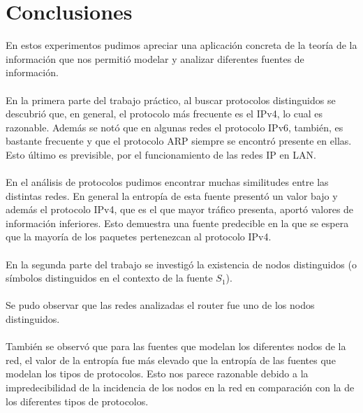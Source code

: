 \section{Conclusiones}
En estos experimentos pudimos apreciar una aplicación concreta de la teoría de la información que nos permitió modelar y analizar diferentes fuentes de información.
\\\\
En la primera parte del trabajo práctico, al buscar protocolos distinguidos se descubrió que, en general, el protocolo más frecuente es el IPv4, lo cual es razonable. Además se notó que en algunas redes el protocolo IPv6, también, es bastante frecuente y que el protocolo ARP siempre se encontró presente en ellas. Esto último es previsible, por el funcionamiento de las redes IP en LAN.
\\\\
En el análisis de protocolos pudimos encontrar muchas similitudes entre las distintas redes. En general la entropía de esta fuente presentó un valor bajo y además el protocolo IPv4, que es el que mayor tráfico presenta, aportó valores de información inferiores. Esto demuestra una fuente predecible en la que se espera que la mayoría de los paquetes pertenezcan al protocolo IPv4.
\\\\
En la segunda parte del trabajo se investigó la existencia de nodos distinguidos (o símbolos distinguidos en el contexto de la fuente $S_1$).
\\\\
Se pudo observar que las redes analizadas el router fue uno de los nodos distinguidos.
\\\\
También se observó que para las fuentes que modelan los diferentes nodos de la red, el valor de la entropía fue más elevado que la entropía de las fuentes que modelan los tipos de protocolos. Esto nos parece razonable debido a la impredecibilidad de la incidencia de los nodos en la red en comparación con la de los diferentes tipos de protocolos.

